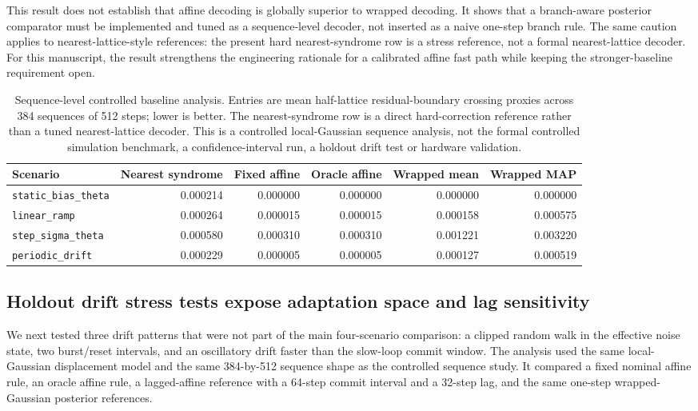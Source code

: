 \documentclass[11pt]{article}
\newcommand{\softwarehil}{controlled simulation}
\begin{document}
This result does not establish that affine decoding is globally superior to
wrapped decoding.  It shows that a branch-aware posterior comparator must be
implemented and tuned as a sequence-level decoder, not inserted as a naive
one-step branch rule.  The same caution applies to nearest-lattice-style
references: the present hard nearest-syndrome row is a stress reference, not a
formal nearest-lattice decoder.  For this manuscript, the result strengthens
the engineering rationale for a calibrated affine fast path while keeping the
stronger-baseline requirement open.

\begin{table}[t]
\centering
\small
\begin{tabular}{@{}lrrrrr@{}}
\toprule
Scenario & Nearest syndrome & Fixed affine & Oracle affine & Wrapped mean & Wrapped MAP \\
\midrule
\texttt{static\_bias\_theta} & 0.000214 & 0.000000 & 0.000000 & 0.000000 & 0.000000 \\
\texttt{linear\_ramp} & 0.000264 & 0.000015 & 0.000015 & 0.000158 & 0.000575 \\
\texttt{step\_sigma\_theta} & 0.000580 & 0.000310 & 0.000310 & 0.001221 & 0.003220 \\
\texttt{periodic\_drift} & 0.000229 & 0.000005 & 0.000005 & 0.000127 & 0.000519 \\
\bottomrule
\end{tabular}
\caption{Sequence-level controlled baseline analysis.  Entries are mean
half-lattice residual-boundary crossing proxies across 384 sequences of 512
steps; lower is better.  The nearest-syndrome row is a direct hard-correction
reference rather than a tuned nearest-lattice decoder.  This is a controlled
local-Gaussian sequence analysis, not the formal \softwarehil{} benchmark, a
confidence-interval run, a holdout drift test or hardware validation.}
\label{tab:sequence-controlled-baselines}
\end{table}

\subsection{Holdout drift stress tests expose adaptation space and lag sensitivity}

We next tested three drift patterns that were not part of the main
four-scenario comparison: a clipped random walk in the effective noise state,
two burst/reset intervals, and an oscillatory drift faster than the slow-loop
commit window.  The analysis used the same local-Gaussian displacement model
and the same 384-by-512 sequence shape as the controlled sequence study.  It
compared a fixed nominal affine rule, an oracle affine rule, a lagged-affine
reference with a 64-step commit interval and a 32-step lag, and the same
one-step wrapped-Gaussian posterior references.
\end{document}
